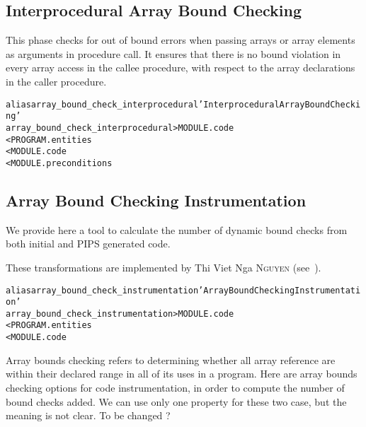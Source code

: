 \documentclass[a4paper]{report}
\newenvironment{PipsMake}{\begin{alltt}}{\end{alltt}}
\newenvironment{PipsPass}[1]{\label{pass:#1}}{}
\begin{document}
\subsection{Interprocedural Array Bound Checking}
\label{subsection-array-bound-check_interprocedural}

\begin{PipsPass}{array_bound_check_interprocedural}
This phase checks for out of bound errors when passing arrays or array
elements as arguments in procedure call. It ensures that there is no bound
violation in every array access in the callee procedure, with respect to
the array declarations in the caller procedure.
\end{PipsPass}

\begin{PipsMake}
alias array_bound_check_interprocedural 'Interprocedural Array Bound Checking'
array_bound_check_interprocedural             > MODULE.code
        < PROGRAM.entities
        < MODULE.code
        < MODULE.preconditions
\end{PipsMake}



\subsection{Array Bound Checking Instrumentation}
\label{subsection-array-bound-check_instrumentation}

\begin{PipsPass}{array_bound_check_instrumentation}

We provide here a tool to calculate the number of dynamic bound checks
from both initial and PIPS generated code.

These transformations are implemented by Thi Viet Nga \textsc{Nguyen} (see~\cite{Ngu02}).
\end{PipsPass}

\begin{PipsMake}
alias array_bound_check_instrumentation 'Array Bound Checking Instrumentation'
array_bound_check_instrumentation > MODULE.code
        < PROGRAM.entities
        < MODULE.code
\end{PipsMake}



Array bounds checking refers to determining whether all array reference
are within their declared range in all of its uses in a program. Here are
array bounds checking options for code instrumentation, in order to
compute the number of bound checks added. We can use only one property for
these two case, but the meaning is not clear. To be changed ?
\end{document}
